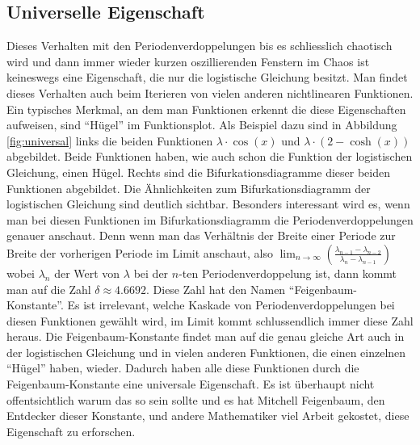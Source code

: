 \subsection{Universelle Eigenschaft}
Dieses Verhalten mit den Periodenverdoppelungen 
bis es schliesslich chaotisch wird und dann
immer wieder kurzen oszillierenden Fenstern im Chaos
ist keineswegs eine Eigenschaft, 
die nur die logistische Gleichung besitzt.
Man findet dieses Verhalten auch beim Iterieren 
von vielen anderen nichtlinearen Funktionen. 
Ein typisches Merkmal, 
an dem man Funktionen erkennt
die diese Eigenschaften aufweisen, 
sind ``Hügel'' im Funktionsplot.
Als Beispiel dazu sind in Abbildung \ref{fig:universal} links
die beiden Funktionen
$\lambda \cdot \cos(x)$
und
$\lambda \cdot (2 - \cosh(x))$
abgebildet.
Beide Funktionen haben, wie auch schon die Funktion
der logistischen Gleichung, einen Hügel. 
Rechts sind die Bifurkationsdiagramme dieser beiden
Funktionen abgebildet. 
Die Ähnlichkeiten zum Bifurkationsdiagramm der logistischen
Gleichung sind deutlich sichtbar. 
Besonders interessant wird es, wenn man
bei diesen Funktionen im Bifurkationsdiagramm 
die Periodenverdoppelungen genauer anschaut.
Denn wenn man das Verhältnis der Breite einer Periode
zur Breite der vorherigen Periode im Limit
anschaut, also 
$
    \lim_{n\to\infty}(\frac{\lambda_{n-1} - \lambda_{n-2}}{\lambda_n - \lambda_{n-1}})
$
wobei $\lambda_n$ der Wert von $\lambda$ bei der $n$-ten
Periodenverdoppelung ist,
dann kommt man auf die Zahl $\delta \approx 4.6692$.
Diese Zahl hat den Namen ``Feigenbaum-Konstante''.
Es ist irrelevant, welche Kaskade von Periodenverdoppelungen
bei diesen Funktionen
gewählt wird, im Limit kommt schlussendlich immer diese Zahl heraus. 
Die Feigenbaum-Konstante findet man auf die genau gleiche Art 
auch in der logistischen Gleichung und in vielen anderen
Funktionen, die einen einzelnen ``Hügel'' haben, wieder.
Dadurch haben alle diese Funktionen durch die 
Feigenbaum-Konstante eine universale Eigenschaft.
Es ist überhaupt nicht offentsichtlich warum das so
sein sollte und es hat Mitchell Feigenbaum, 
den Entdecker dieser Konstante, und andere Mathematiker 
viel Arbeit gekostet, diese Eigenschaft zu erforschen. 

